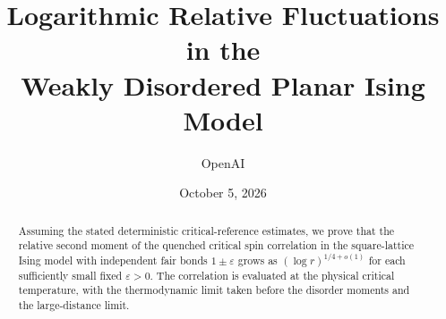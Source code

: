 \documentclass[11pt]{article}
\title{Logarithmic Relative Fluctuations in the\texorpdfstring{\\}{ }Weakly Disordered Planar Ising Model}
\author{OpenAI}
\date{October 5, 2026}
\theoremstyle{definition}
\theoremstyle{remark}
\newcommand{\eps}{\varepsilon}
\numberwithin{equation}{section}
\begin{document}
\maketitle
\begin{abstract}
Assuming the stated deterministic critical-reference estimates, we prove
that the relative second moment of the quenched critical spin correlation
in the square-lattice Ising model with independent fair bonds $1\pm\eps$
grows as $(\log r)^{1/4+o(1)}$ for each sufficiently small fixed $\eps>0$.
The correlation is evaluated at the physical critical temperature, with
the thermodynamic limit taken before the disorder moments and the
large-distance limit.
\end{abstract}
\setcounter{tocdepth}{1}
\tableofcontents
\clearpage











\end{document}
